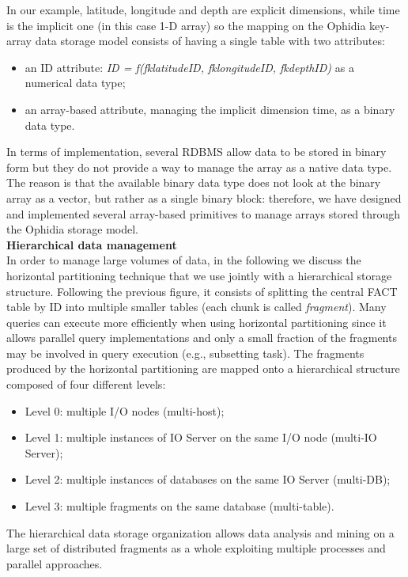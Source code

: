 In our example, latitude, longitude and depth are explicit dimensions, while time is the implicit one (in this case 1-D array) so the mapping on the Ophidia key-array data storage model consists of having a single table with two attributes:
\begin{itemize}
	\item an ID attribute: \textit{ID = f(fk\textunderscore latitudeID, fk\textunderscore longitudeID, fk\textunderscore depthID)} as a numerical data type;
	\item an array-based attribute, managing the implicit dimension time, as a binary data type.
\end{itemize}
In terms of implementation, several RDBMS allow data to be stored in binary form but they do not provide a way to manage the array as a native data type. The reason is that the available binary data type does not look at the binary array as a vector, but rather as a single binary block: therefore, we have designed and implemented several array-based primitives to manage arrays stored through the Ophidia storage model.\\

\textbf{Hierarchical data management}\\

In order to manage large volumes of data, in the following we discuss the horizontal partitioning technique that we use jointly with a hierarchical storage structure. Following the previous figure, it consists of splitting the central FACT table by ID into multiple smaller tables (each chunk is called \textit{fragment}). Many queries can execute more efficiently when using horizontal partitioning since it allows parallel query implementations and only a small fraction of the fragments may be involved in query execution (e.g., subsetting task). The fragments produced by the horizontal partitioning are mapped onto a hierarchical structure composed of four different levels:
\begin{itemize}
	\item Level 0: multiple I/O nodes (multi-host);
	\item Level 1: multiple instances of IO Server on the same I/O node (multi-IO Server);
	\item Level 2: multiple instances of databases on the same IO Server (multi-DB);
	\item Level 3: multiple fragments on the same database (multi-table).
\end{itemize}
The hierarchical data storage organization allows data analysis and mining on a large set of distributed fragments as a whole exploiting multiple processes and parallel approaches.

